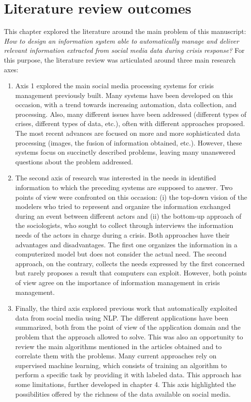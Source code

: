 \section{Literature review outcomes}
This chapter explored the literature around the main problem of this manuscript:
\emph{How to design an information system able to automatically manage and deliver relevant information extracted from social media data during crisis response?}
For this purpose, the literature review was articulated around three main research axes:

\begin{enumerate}
    \item Axis 1 explored the main social media processing systems for crisis management previously built.
          Many systems have been developed on this occasion, with a trend towards increasing automation, data collection, and processing.
          Also, many different issues have been addressed (different types of crises, different types of data, etc.), often with different approaches proposed.
          The most recent advances are focused on more and more sophisticated data processing (images, the fusion of information obtained, etc.).
          However, these systems focus on succinctly described problems, leaving many unanswered questions about the problem addressed.
    \item The second axis of research was interested in the needs in identified information to which the preceding systems are supposed to answer.
          Two points of view were confronted on this occasion: (i) the top-down vision of the modelers who tried to represent and organize the information exchanged during an event between different actors and
          (ii) the bottom-up approach of the sociologists, who sought to collect through interviews the information needs of the actors in charge during a crisis.
          Both approaches have their advantages and disadvantages. The first one organizes the information in a computerized model but does not consider the actual need.
          The second approach, on the contrary, collects the needs expressed by the first concerned but rarely proposes a result that computers can exploit.
          However, both points of view agree on the importance of information management in crisis management.
    \item Finally, the third axis explored previous work that automatically exploited data from social media using NLP.
          The different applications have been summarized, both from the point of view of the application domain and the problem that the approach allowed to solve.
          This was also an opportunity to review the main algorithms mentioned in the articles obtained and to correlate them with the problems.
          Many current approaches rely on supervised machine learning, which consists of training an algorithm to perform a specific task by providing it with labeled data.
          This approach has some limitations, further developed in chapter 4.
          This axis highlighted the possibilities offered by the richness of the data available on social media.
\end{enumerate}

